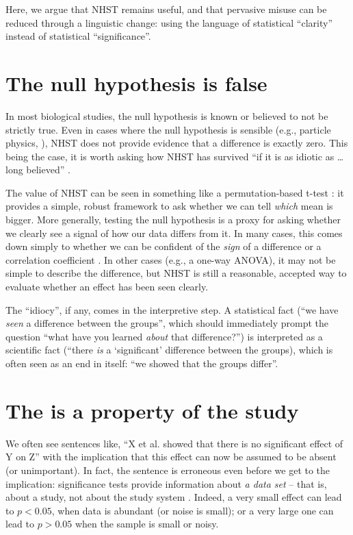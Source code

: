 Here, we argue that NHST remains useful, and that pervasive misuse can be reduced through a linguistic change: using the language of statistical ``clarity'' instead of statistical ``significance''.

\section*{The null hypothesis is false}

In most biological studies, the null hypothesis is known or believed to not be strictly true.
Even in cases where the null hypothesis is sensible (e.g., particle physics, \cite{Staley2017}), NHST does not provide evidence that a difference is exactly zero.
This being the case, it is worth asking how NHST has survived ``if it is as idiotic as \ldots long believed'' \citet[cited in \cite{Kramer2011}]{ZiliakandMcCloskey2008}.

The value of NHST can be seen in something like a permutation-based t-test \cite[Chapter 1]{GoodBook}: it provides a simple, robust framework to ask whether we can tell \emph{which} mean is bigger. 
More generally, testing the null hypothesis is a proxy for asking whether we clearly see a signal of how our data differs from it.
In many cases, this comes down simply to whether we can be confident of the \emph{sign} of a difference or a correlation coefficient \citep{robinson2001past}. 
In other cases (e.g., a one-way ANOVA), it may not be simple to describe the difference, but NHST is still a reasonable, accepted way to evaluate whether an effect has been seen clearly.

The ``idiocy'', if any, comes in the interpretive step. A statistical fact (``we have \emph{seen} a difference between the groups'', which should immediately prompt the question ``what have you learned \emph{about} that difference?'') is interpreted as a scientific fact (``there \emph{is} a `significant' difference between the groups), which is often seen as an end in itself: ``we showed that the groups differ''.

\section*{The \pval is a property of the study}

We often see sentences like, ``X et al. showed that there is no significant effect of Y on Z'' with the implication that this effect can now be assumed to be absent (or unimportant). In fact, the sentence is erroneous even before we get to the implication: significance tests provide information about \emph{a data set} -- that is, about a study, not about the study system \citep{HoenigandHeisey2001}.
Indeed, a very small effect can lead to $p < 0.05$, when data is abundant (or noise is small); or a very large one can lead to $p > 0.05$ when the sample is small or noisy. 

